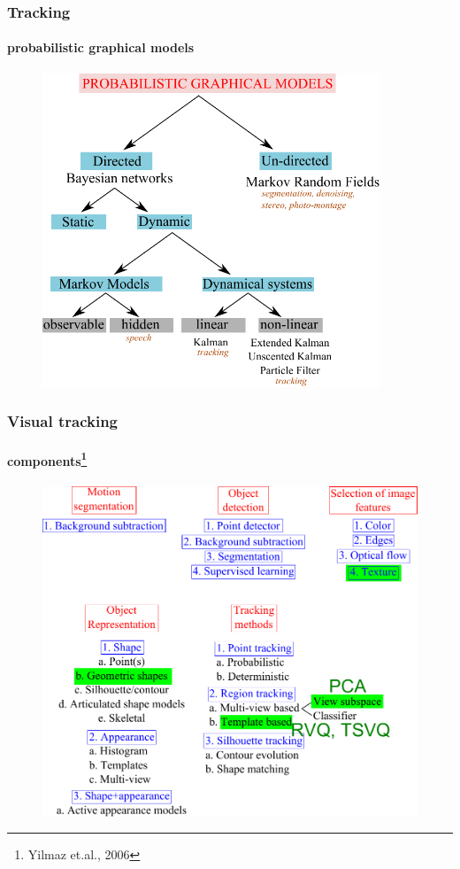 \begin{frame}
\frametitle{Tracking}
\framesubtitle{probabilistic graphical models}
\mypagenum{}
	\begin{figure}
		\includegraphics[width=0.9\textwidth]{thesis/PRML_PGM_overview.pdf}
	\end{figure}
\end{frame}



\begin{frame}
\frametitle{Visual tracking}
\framesubtitle{components\tiny{\footnote {Yilmaz et.al., 2006}}}
\mypagenum{}
\begin{figure}
\includegraphics[height=0.8\textheight]{thesis/TRK_overview.pdf}
\end{figure}	
\end{frame}


